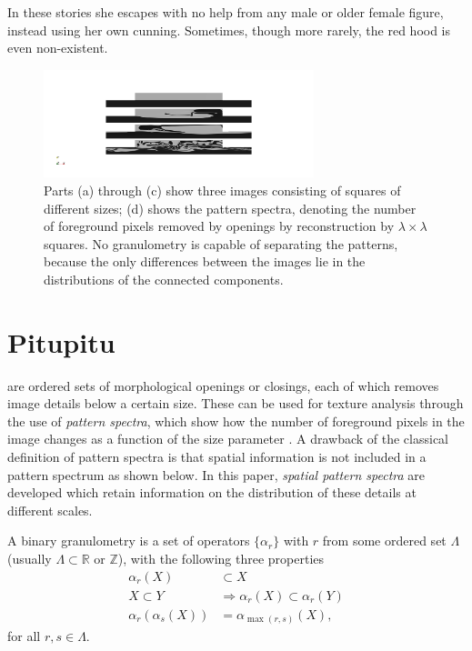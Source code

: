 \documentclass[plainboxedsections, 25pt, a1]{sciposter}
\begin{document}
\begin{multicols}{3}
In these stories she escapes with no help from any male or older female figure, instead using her own cunning. Sometimes, though more rarely, the red hood is even non-existent.
 
\begin{figure}
\begin{center}
\includegraphics[width=0.7\textwidth]{burzawszklance.png}
\end{center}
\caption{ Parts (a) through (c) show three images consisting of squares of
different sizes;
(d) shows the pattern spectra, denoting the number of foreground pixels 
 removed by openings by reconstruction by $\lambda \times \lambda$ squares. No 
granulometry is capable of separating the patterns, because the only 
differences between the images lie in the distributions of the 
connected components. }\label{fig:blocks}
\end{figure} 

 
\section{Pitupitu}
 are ordered sets of morphological openings or closings, each of
which removes image details below a certain size. These can be used for texture
analysis
through the use of \emph{pattern spectra}, which show how the number of 
foreground pixels in the image changes as a function of the size parameter 
\cite{maragos89:_patter}.
A drawback of the classical definition of pattern spectra is that spatial 
information is not included in a pattern spectrum as shown below.
 In this paper, \emph{spatial pattern spectra} are developed which retain information on the distribution of these details at different scales.
 



A binary 
granulometry is a set of operators $\{\alpha_r\}$ with $r$ from some ordered 
set $\Lambda$ (usually $\Lambda \subset {\mathbb R}$ or ${\mathbb Z}$), with 
the following three properties
\begin{align}
   \alpha_r(X) & \subset  X \label{eq:antiext} \\
   X \subset Y & \Rightarrow \alpha_r(X) \subset \alpha_r(Y) 
   \label{eq:increasing} \\
   \alpha_r(\alpha_s(X)) & =  \alpha_{\max(r,s)}(X) \label{eq:idempot},
\end{align}   
for all $r,s \in \Lambda$.



\end{multicols}
\end{document}
